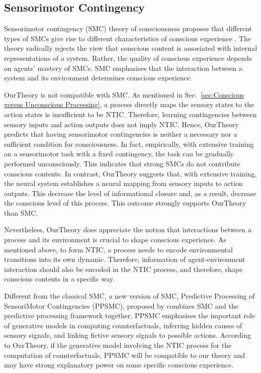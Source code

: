 \documentclass[utf8]{article}
\begin{document}
		\subsection{Sensorimotor Contingency}
    		Sensorimotor contingency (SMC) theory of consciousness proposes that different types of SMCs give rise to different characteristics of conscious experience \citep{o2001sensorimotor}. The theory radically rejects the view that conscious content is associated with internal representations of a system. Rather, the quality of conscious experience depends on agents' mastery of SMCs. SMC emphasises that the interaction between a system and its environment determines conscious experience. 
    	
    	    \ac{OurTheory} is not compatible with SMC. As mentioned in Sec.~\ref{sec:Conscious versus Unconscious Processing}, a process directly maps the sensory states to the action states is insufficient to be NTIC. Therefore, learning contingencies between sensory inputs and action outputs does not imply NTIC. Hence, \ac{OurTheory} predicts that having sensorimotor contingencies is neither a necessary nor a sufficient condition for consciousness. In fact, empirically, with extensive training on a sensorimotor task with a fixed contingency, the task can be gradually performed unconsciously. This indicates that strong SMCs do not contribute conscious contents. In contrast, \ac{OurTheory} suggests that, with extensive training, the neural system establishes a neural mapping from sensory inputs to action outputs. This decrease the level of informational closure and, as a result, decrease the conscious level of this process. This outcome strongly supports \ac{OurTheory} than SMC. 
    	    
    	    Nevertheless, \ac{OurTheory} does appreciate the notion that interactions between a process and its environment is crucial to shape conscious experience. As mentioned above, to form NTIC, a process needs to encode environmental transitions into its own dynamic. Therefore, information of agent-environment interaction should also be encoded in the NTIC process, and therefore, shape conscious contents in a specific way. 
    	    
    	    Different from the classical SMC, a new version of SMC, Predictive Processing of SensoriMotor Contingencies (PPSMC), proposed by \cite{seth2014predictive, seth2015presence} combines SMC and the predictive processing framework together. PPSMC emphasises the important role of generative models in computing counterfactuals, inferring hidden causes of sensory signals, and linking fictive sensory signals to possible actions. According to \ac{OurTheory}, if the generative model involving the NTIC process for the computation of counterfactuals, PPSMC will be compatible to our theory and may have strong explanatory power on some specific conscious experience.
    	    
\end{document}
